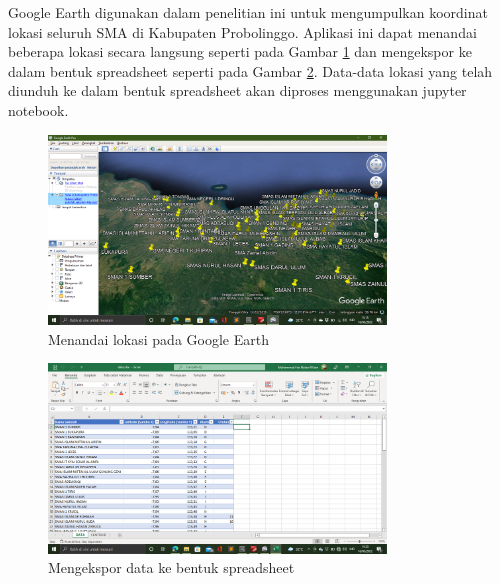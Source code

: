 \begin{enumerate}
	Google Earth digunakan dalam penelitian ini untuk mengumpulkan koordinat lokasi seluruh SMA di Kabupaten Probolinggo. Aplikasi ini dapat menandai beberapa lokasi secara langsung seperti pada Gambar \ref{fig:markloc} dan mengekspor ke dalam bentuk spreadsheet seperti pada Gambar \ref{fig:eksspread}. Data-data lokasi yang telah diunduh ke dalam bentuk spreadsheet akan diproses menggunakan jupyter notebook.

\begin{figure}[H]
  \centering
  \includegraphics[width=0.8\textwidth]{Gambar/google earth.png}
  \caption{Menandai lokasi pada Google Earth}
  \label{fig:markloc}
\end{figure}

\begin{figure}[H]
  \centering
  \includegraphics[width=0.8\textwidth]{Gambar/ekspor spreadsheet.png}
  \caption{Mengekspor data ke bentuk spreadsheet}
  \label{fig:eksspread}
\end{figure}

\end{enumerate}

